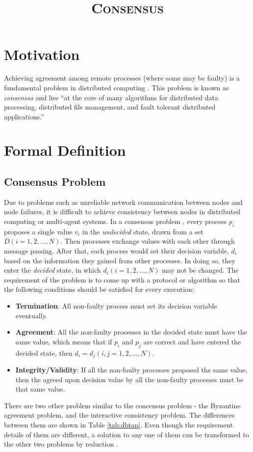 \documentclass[12pt, a4paper]{article}
\title{\textsc{Consensus}}
\author{}
\date{}
\begin{document}
\maketitle


\section{Motivation}

Achieving agreement among remote processes (where some may be faulty) is a
fundamental problem in distributed computing \cite{fischer1985impossibility}.
This problem is known as \textit{consensus} and lies ``at the core of many
algorithms for distributed data processing, distributed file management, and
fault tolerant distributed applications.'' \cite{fischer1985impossibility}

\section{Formal Definition}

\subsection{Consensus Problem}

Due to problems such as unreliable network communication between nodes and node
failures, it is difficult to achieve consistency between nodes in distributed
computing or multi-agent systems. In a consensus problem
\cite{coulouris2005distributed}, every process $p_{i}$ proposes a single value
$v_{i}$ in the \textit{undecided} state, drawn from a set $D(i = 1,2,...,N)$.
Then processes exchange values with each other through message passing. After
that, each process would set their decision variable, $d_{i}$ based on the
information they gained from other processes. In doing so, they enter the
\textit{decided} state, in which $d_{i} (i = 1, 2, ..., N)$ may not be changed.
The requirement of the problem is to come up with a protocol or algorithm so
that the following conditions should be satisfied for every execution:
\begin{itemize} \item \textbf{Termination}: All non-faulty process must set its
decision variable eventually. \item \textbf{Agreement}: All the non-faulty
processes in the decided state must have the same value, which means that if
$p_{i}$ and $p_{j}$ are correct and have entered the decided state, then $d_{i} =
d_{j}(i, j = 1, 2, ..., N)$. \item \textbf{Integrity/Validity}: If all the
non-faulty processes proposed the same value, then the agreed upon decision
value by all the non-faulty processes must be that same value. \end{itemize}
There are two other problem similar to the concensus problem - the Byzantine
agreement problem, and the interactive consistency problem. The differences
between them are shown in Table \ref{tab:dbtap}. Even though the requirement
details of them are different, a solution to any one of them can be transformed
to the other two problems by reduction \cite{fischer1983consensus}.
\end{document}
